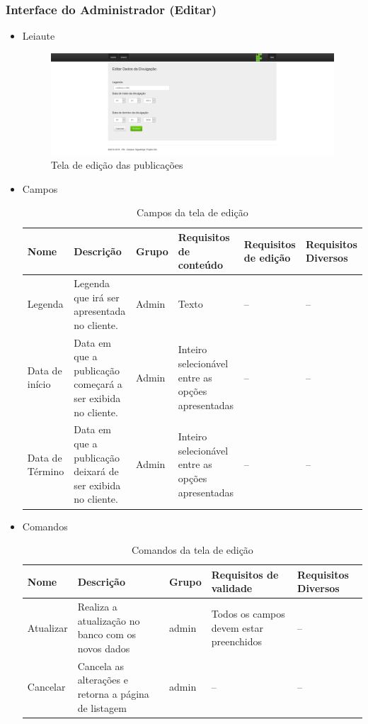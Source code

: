     \subsubsection{Interface do Administrador (Editar)}
        \begin{itemize}
        \item Leiaute
            \begin{figure}[H]
                \centering
                \includegraphics[width=\textwidth]{figuras/telaeditar}
                \caption{Tela de edição das publicações}
            \end{figure}
        \item Campos
\begin{table}[H]
            \caption{Campos da tela de edição}

                \begin{tabular}{|p{1.5cm}|p{3cm}|p{1.1cm}|p{3cm}|p{2.2cm}|p{2.5cm}|}
                \hline
Nome & Descrição & Grupo & Requisitos de conteúdo & Requisitos de edição & Requisitos Diversos \\ \hline
Legenda & Legenda que irá ser apresentada no cliente. & Admin & Texto & -- & -- \\ \hline
Data de início & Data em que a publicação começará a ser exibida no cliente. & Admin & Inteiro selecionável entre as opções apresentadas & -- & -- \\ \hline
Data de Término & Data em que a publicação deixará de ser exibida no cliente. & Admin & Inteiro selecionável entre as opções apresentadas & -- & -- \\ \hline
                \end{tabular}%
            \end{table}
        \item Comandos
            \begin{table}[H]
                \caption{Comandos da tela de edição}
                \begin{tabular}{|p{2cm}|p{4.7cm}|p{1.1cm}|p{3.9cm}|p{2cm}|}
                \hline
Nome & Descrição & Grupo & Requisitos de validade & Requisitos Diversos \\ \hline
Atualizar & Realiza a atualização no banco com os novos dados & admin & Todos os campos devem estar preenchidos & -- \\ \hline
Cancelar & Cancela as alterações e retorna a página de listagem & admin & -- & -- \\ \hline
                \end{tabular}%

            \end{table}
    \end{itemize}
        
